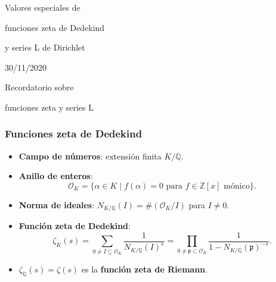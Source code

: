 \documentclass[handout]{beamer}
\newcommand{\ZZ}{\mathbb{Z}}
\newcommand{\QQ}{\mathbb{Q}}
\renewcommand{\O}{\mathcal{O}}
\begin{document}

\begin{frame}[noframenumbering]
  \headingfont
  \begin{center}
    {\huge Valores especiales de

      funciones zeta de Dedekind

      y series L de Dirichlet

    }

    \vspace{3em}

    30/11/2020

  \end{center}
\end{frame}


\begin{frame}[plain]
  \headingfont

  \begin{center}
    {\huge Recordatorio sobre

      funciones zeta y series L

    }
  \end{center}
\end{frame}


\begin{frame}
  \frametitle{Funciones zeta de Dedekind}

  \begin{itemize}
  \item<1-> \textbf{Campo de números}: extensión finita $K/\QQ$.

  \item<2-> \textbf{Anillo de enteros}:
    $$\O_K = \{ \alpha \in K \mid f (\alpha) = 0\text{ para }f \in \ZZ[x]\text{ mónico} \}.$$

  \item<3-> \textbf{Norma de ideales}: $N_{K/\QQ} (I) = \# (\O_K/I)$ para $I \ne 0$.

  \item<4-> \textbf{Función zeta de Dedekind}:
    $$\zeta_K (s) = \sum_{0 \ne I \subseteq \O_K} \frac{1}{N_{K/\QQ} (I)^s} = \prod_{0 \ne \mathfrak{p} \subset \O_K} \frac{1}{1 - N_{K/\QQ} (\mathfrak{p})^{-s}}.$$

  \item<5-> $\zeta_\QQ (s) = \zeta (s)$ es la \textbf{función zeta de Riemann}.
  \end{itemize}
\end{frame}
\end{document}
